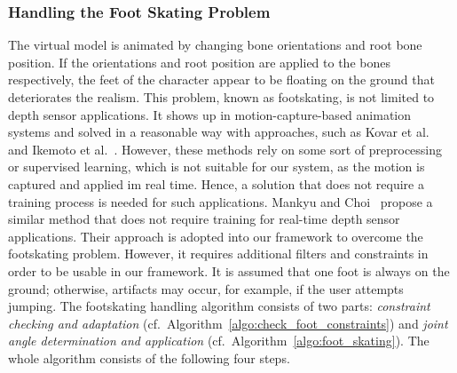 \documentclass[number,preprint,review,12pt]{elsarticle}
\begin{document}
\subsubsection{Handling the Foot Skating Problem}
\label{section_foot_skating}
The virtual model is animated by changing bone orientations and root bone position. If the orientations and root position are applied to the bones respectively, the feet of the character appear to be floating on the ground that deteriorates the realism. 
This problem, known as footskating, is not limited to depth sensor applications. It shows up in motion-capture-based animation systems and solved in a reasonable way with approaches, such as Kovar et al.~\cite{Kovar2002} and Ikemoto et al.~\cite{Ikemoto2006}. However, these methods rely on some sort of preprocessing or supervised learning, which is not suitable for our system, as the motion is captured and applied im real time. Hence, a solution that does not require a training process is needed for such applications. Mankyu and Choi~\cite{Mankyu2013} propose a similar method that does not require training for real-time depth sensor applications. Their approach is adopted into our framework to overcome the footskating problem. However, it requires additional filters and constraints in order to be usable in our framework. It is assumed that one foot is always on the ground; otherwise, artifacts may occur, for example, if the user attempts jumping. The footskating handling algorithm consists of two parts: {\em constraint checking and adaptation} (cf.~Algorithm~\ref{algo:check_foot_constraints}) and {\em joint angle determination and application} (cf.~Algorithm~\ref{algo:foot_skating}). The whole   algorithm consists of the following four steps. 
\end{document}
